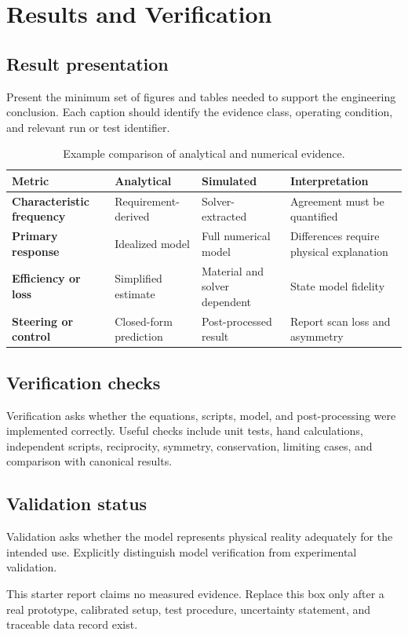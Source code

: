 \chapter{Results and Verification}

\section{Result presentation}
Present the minimum set of figures and tables needed to support the engineering
conclusion. Each caption should identify the evidence class, operating condition, and
relevant run or test identifier.

\begin{table}[H]
\centering
\caption{Example comparison of analytical and numerical evidence.}
\label{tab:comparison}
\begin{tabularx}{\textwidth}{>{\bfseries}p{}XXX}
\toprule
Metric & Analytical & Simulated & Interpretation \\
\midrule
Characteristic frequency & Requirement-derived & Solver-extracted & Agreement must be quantified \\
Primary response & Idealized model & Full numerical model & Differences require physical explanation \\
Efficiency or loss & Simplified estimate & Material and solver dependent & State model fidelity \\
Steering or control & Closed-form prediction & Post-processed result & Report scan loss and asymmetry \\
\bottomrule
\end{tabularx}
\end{table}

\section{Verification checks}
Verification asks whether the equations, scripts, model, and post-processing were
implemented correctly. Useful checks include unit tests, hand calculations,
independent scripts, reciprocity, symmetry, conservation, limiting cases, and
comparison with canonical results.

\section{Validation status}
Validation asks whether the model represents physical reality adequately for the
intended use. Explicitly distinguish model verification from experimental validation.

\begin{measuredevidencebox}
This starter report claims no measured evidence. Replace this box only after a real
prototype, calibrated setup, test procedure, uncertainty statement, and traceable data
record exist.
\end{measuredevidencebox}
